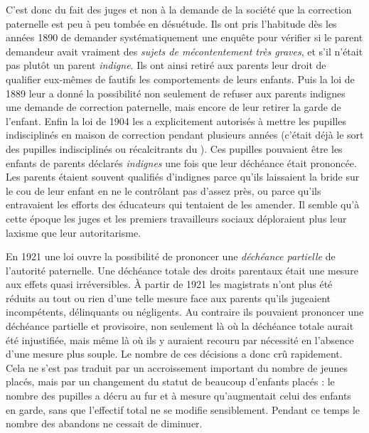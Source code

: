  C'est donc du fait des juges et non à la demande de la société que la correction paternelle est peu à peu tombée en désuétude. Ils ont pris l'habitude dès les années 1890 de demander systématiquement une enquête pour vérifier si le parent demandeur avait vraiment des \emph{sujets de mécontentement très graves}, et s'il n'était pas plutôt un parent \emph{indigne}. Ils ont ainsi retiré aux parents leur droit de qualifier eux-mêmes de fautifs les comportements de leurs enfants. Puis la loi de 1889 leur a donné la possibilité non seulement de refuser aux parents indignes une demande de correction paternelle, mais encore de leur retirer la garde de l'enfant. Enfin la loi de 1904 les a explicitement autorisés à mettre les pupilles indisciplinés en maison de correction pendant plusieurs années (c'était déjà le sort des pupilles indisciplinés ou récalcitrants du ). Ces pupilles pouvaient être les enfants de parents déclarés \emph{indignes} une fois que leur déchéance était prononcée. Les parents étaient souvent qualifiés d'indignes parce qu'ils laissaient la bride sur le cou de leur enfant en ne le contrôlant pas d'assez près, ou parce qu'ils entravaient les efforts des éducateurs qui tentaient de les amender. Il semble qu'à cette époque les juges et les premiers travailleurs sociaux déploraient plus leur laxisme que leur autoritarisme. 

 En 1921 une loi ouvre la possibilité de prononcer une \emph{déchéance partielle} de l'autorité paternelle. Une déchéance totale des droits parentaux était une mesure aux effets quasi irréversibles. À partir de 1921 les magistrats n'ont plus été réduits au tout ou rien d'une telle mesure face aux parents qu'ils jugeaient incompétents, délinquants ou négligents. Au contraire ils pouvaient prononcer une déchéance partielle et provisoire, non seulement là où la déchéance totale aurait été injustifiée, mais même là où ils y auraient recouru par nécessité en l'absence d'une mesure plus souple. Le nombre de ces décisions a donc crû rapidement. Cela ne s'est pas traduit par un accroissement important du nombre de jeunes placés, mais par un changement du statut de beaucoup d'enfants placés : le nombre des pupilles a décru au fur et à mesure qu'augmentait celui des enfants en garde, sans que l'effectif total ne se modifie sensiblement. Pendant ce temps le nombre des abandons ne cessait de diminuer.

